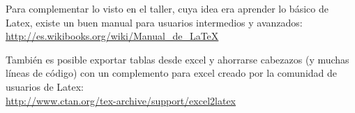 \documentclass[letterpaper,twoside]{article}
\begin{document}

Para complementar lo visto en el taller, cuya idea era aprender lo b\'asico de Latex, existe un buen manual para usuarios intermedios y avanzados:\\ 
\url{http://es.wikibooks.org/wiki/Manual_de_LaTeX}

Tambi\'en es posible exportar tablas desde excel y ahorrarse cabezazos (y muchas l\'ineas de c\'odigo) con un complemento para excel creado por la comunidad de usuarios de Latex:\\
\url{http://www.ctan.org/tex-archive/support/excel2latex} 
\end{document}
